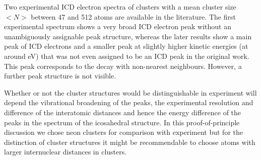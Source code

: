Two experimental ICD electron spectra of clusters
with a mean cluster size $<N>$ between 47 and 512 atoms
are available in the literature.
\cite{Marburger03,Barth06_2} 
The first experimental spectrum shows a very
broad ICD electron peak without an unambiguously assignable peak structure,
whereas the later results show a main peak of ICD electrons and a smaller peak
at slightly higher kinetic energies (at around \unit[3]{eV})
that was not even assigned to be an ICD peak in the original work. This peak
corresponds to the decay with non-nearest neighbours. However, a further peak
structure is not visible.

Whether or not the cluster structures would be distinguishable in experiment
will depend the vibrational broadening of the peaks, the experimental
resolution and difference of the interatomic distances
and hence the energy difference of the peaks in the spectrum of the
icosahedral structure. In this proof-of-principle discussion
we chose neon clusters for comparison with experiment but for the distinction
of cluster structures it might be recommendable to choose atoms with larger
internuclear distances in clusters.

